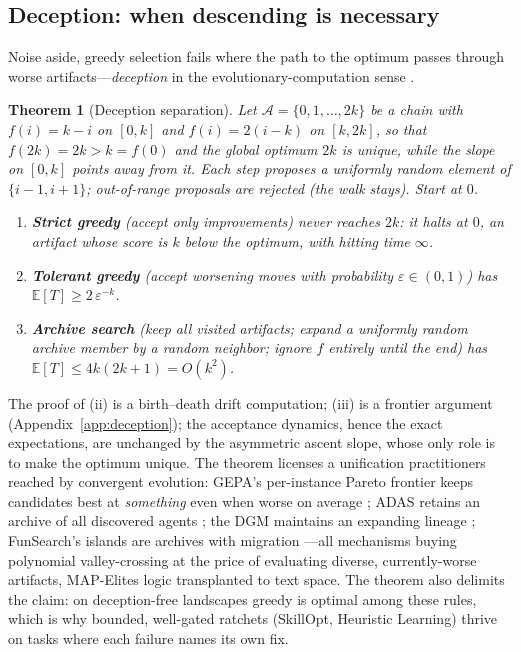 \documentclass{article}
\theoremstyle{plain}
\newtheorem{theorem}{Theorem}[section]
\theoremstyle{definition}
\theoremstyle{remark}
\newcommand{\A}{\mathcal{A}}
\newcommand{\E}{\mathbb{E}}
\newcommand{\eps}{\varepsilon}
\begin{document}
\subsection{Deception: when descending is necessary}
\label{sec:deception}

Noise aside, greedy selection fails where the path to the optimum passes through worse artifacts---\emph{deception} in the evolutionary-computation sense \citep{lehman2011abandoning, stanley2015greatness}.

\begin{theorem}[Deception separation]
\label{thm:deception}
Let $\A = \{0, 1, \dots, 2k\}$ be a chain with $f(i) = k - i$ on $[0, k]$ and $f(i) = 2(i - k)$ on $[k, 2k]$, so that $f(2k) = 2k > k = f(0)$ and the global optimum $2k$ is \emph{unique}, while the slope on $[0,k]$ points away from it. Each step proposes a uniformly random element of $\{i-1, i+1\}$; out-of-range proposals are rejected (the walk stays). Start at $0$.
\begin{enumerate}\itemsep1pt
\item[(i)] \textbf{Strict greedy} (accept only improvements) never reaches $2k$: it halts at $0$, an artifact whose score is $k$ below the optimum, with hitting time $\infty$.
\item[(ii)] \textbf{Tolerant greedy} (accept worsening moves with probability $\eps \in (0,1)$) has $\E[T] \ge 2\,\eps^{-k}$.
\item[(iii)] \textbf{Archive search} (keep all visited artifacts; expand a uniformly random archive member by a random neighbor; ignore $f$ entirely until the end) has $\E[T] \le 4k(2k+1) = O(k^2)$.
\end{enumerate}
\end{theorem}

The proof of (ii) is a birth--death drift computation; (iii) is a frontier argument (Appendix~\ref{app:deception}); the acceptance dynamics, hence the exact expectations, are unchanged by the asymmetric ascent slope, whose only role is to make the optimum unique. The theorem licenses a unification practitioners reached by convergent evolution: GEPA's per-instance Pareto frontier keeps candidates best at \emph{something} even when worse on average \citep{agrawal2025gepa}; ADAS retains an archive of all discovered agents \citep{hu2025adas}; the DGM maintains an expanding lineage \citep{zhang2025dgm}; FunSearch's islands are archives with migration \citep{romeraparedes2024funsearch}---all mechanisms buying polynomial valley-crossing at the price of evaluating diverse, currently-worse artifacts, MAP-Elites logic \citep{mouret2015illuminating} transplanted to text space. The theorem also delimits the claim: on deception-free landscapes greedy is optimal among these rules, which is why bounded, well-gated ratchets (SkillOpt, Heuristic Learning) thrive on tasks where each failure names its own fix.
\end{document}

